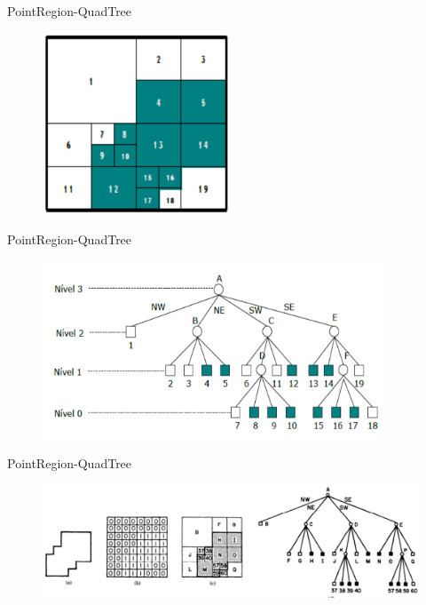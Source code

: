 \documentclass[red, tikz, aspectratio=169, xcolor=dvipsnames]{beamer}
\begin{document}
			\begin{frame}{PointRegion-QuadTree}
				\begin{figure}
					\centering
					\includegraphics[width=0.5\textwidth]{img/pf_3.png}
				\end{figure}
			\end{frame}
			
			\begin{frame}{PointRegion-QuadTree}
				\begin{figure}
					\centering
					\includegraphics[width=0.9\textwidth]{img/pf_4.png}
				\end{figure}
			\end{frame}
			
			\begin{frame}{PointRegion-QuadTree}
				\begin{figure}
					\centering
					\includegraphics[width=1\textwidth]{img/pf_5.png}
				\end{figure}
			\end{frame}
			
\end{document}
